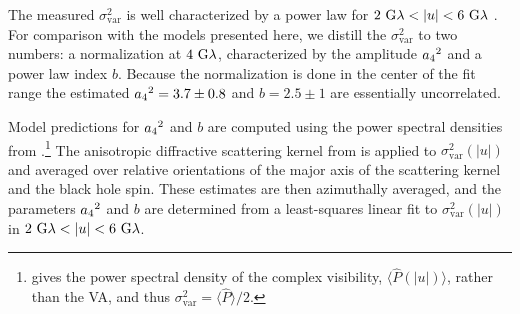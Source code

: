 The measured $\sigma_\text{var}^2$ is well characterized by a power law for $2~{\rm G}\lambda < |u| < 6~{\rm G}\lambda$ \citep{Georgiev_2022}.  For comparison with the models presented here, we distill the $\sigma_{\text{var}}^2$ to two numbers: a normalization at $4~{\rm G}\lambda$, characterized by the amplitude ${a_4}^2$ and a power law index $b$.  Because the normalization is done in the center of the fit range the estimated ${a_4}^2=3.7\pm0.8$ and $b=2.5\pm1$ are essentially uncorrelated.

Model predictions for ${a_4}^2$ and $b$ are computed using the power spectral densities from \citet{Georgiev_2022}.\footnote{\citet{Georgiev_2022} gives the power spectral density of the complex visibility, $\langle\hat{P}(|u|)\rangle$, rather than the VA, and thus $\sigma_\text{var}^2=\langle \hat{P}\rangle/2$. } The anisotropic diffractive scattering kernel from \citet{Johnson_2018} is applied to $\sigma_\text{var}^2(|u|)$ and averaged over relative orientations of the major axis of the scattering kernel and the black hole spin.  These estimates are then azimuthally averaged, and the parameters ${a_4}^2$ and $b$ are determined from a least-squares linear fit to $\sigma_\text{var}^2(|u|)$ in $2~{\rm G}\lambda < |u| < 6~{\rm G}\lambda$.
